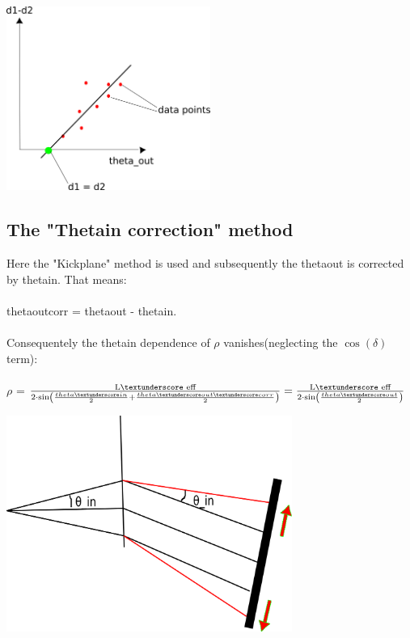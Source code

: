 \documentclass[12pt, letterpaper]{article}
\begin{document}
\begin{center}
	\includegraphics[width=0.5\textwidth]{theta_out_vs_d.png}
\end{center}


\subsection{The "Theta\textunderscore in correction" method}

Here the "Kickplane" method is used and subsequently the theta\textunderscore out is corrected by  theta\textunderscore in. That means:\\
\\
theta\textunderscore out\textunderscore corr = theta\textunderscore out - theta\textunderscore in.\\
\\
Consequentely the theta\textunderscore in dependence of $\rho$ vanishes(neglecting the $\cos(\delta)$ term):\\
\\

$\rho$ = $\frac{\textrm{L\textunderscore eff}}{2\cdot\sin\left(\frac{theta\textunderscore in}{2} +\frac{theta\textunderscore out\textunderscore corr}{2}\right)} = \frac{\textrm{L\textunderscore eff}}{2\cdot\sin\left(\frac{theta\textunderscore out}{2}\right)}$
\begin{center}
	\includegraphics[width=0.7\textwidth]{theta_out_corr_alg.png}
\end{center}
\end{document}
